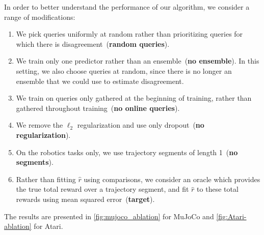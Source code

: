 \documentclass{article}
\def\rest{\hat{r}}  %
\begin{document}
In order to better understand the performance of our algorithm, we consider a range of modifications:
\begin{enumerate}
\item We pick queries uniformly at random rather than prioritizing queries for which there is disagreement~(\textbf{random queries}).
\item We train only one predictor rather than an ensemble~(\textbf{no ensemble}). In this setting, we also choose queries at random, since there is no longer an ensemble that we could use to estimate disagreement.
\item We train on queries only gathered at the beginning of training, rather than gathered throughout training~(\textbf{no online queries}).
\item We remove the $\ell_2$ regularization and use only dropout~(\textbf{no regularization}).
\item On the robotics tasks only, we use trajectory segments of length 1~(\textbf{no segments}).
\item Rather than fitting $\rest$ using comparisons,
we consider an oracle which provides the true total reward over a trajectory segment,
and fit $\rest$ to these total rewards using mean squared error~(\textbf{target}).
\end{enumerate}
The results are presented in
\autoref{fig:mujoco_ablation} for MuJoCo and \autoref{fig:Atari-ablation} for Atari.
\end{document}
